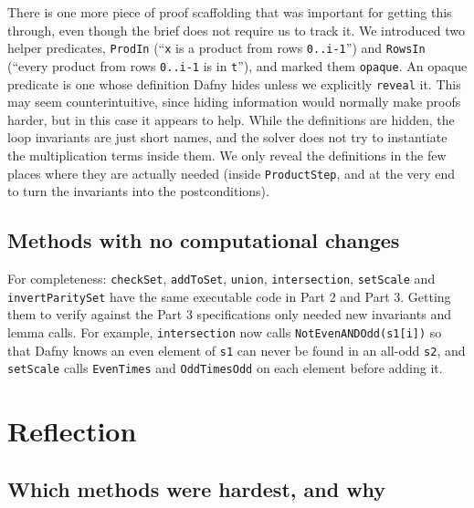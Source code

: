 \documentclass[11pt,a4paper]{article}
\begin{document}
There is one more piece of proof scaffolding that was important for getting this through, even though the brief does not require us to track it. We introduced two helper predicates, \texttt{ProdIn} (``\texttt{x} is a product from rows \texttt{0..i-1}'') and \texttt{RowsIn} (``every product from rows \texttt{0..i-1} is in \texttt{t}''), and marked them \texttt{opaque}. An opaque predicate is one whose definition Dafny hides unless we explicitly \texttt{reveal} it. This may seem counterintuitive, since hiding information would normally make proofs harder, but in this case it appears to help. While the definitions are hidden, the loop invariants are just short names, and the solver does not try to instantiate the multiplication terms inside them. We only reveal the definitions in the few places where they are actually needed (inside \texttt{ProductStep}, and at the very end to turn the invariants into the postconditions).

\subsection*{Methods with no computational changes}

For completeness: \texttt{checkSet}, \texttt{addToSet}, \texttt{union}, \texttt{intersection}, \texttt{setScale} and \texttt{invertParitySet} have the same executable code in Part 2 and Part 3. Getting them to verify against the Part 3 specifications only needed new invariants and lemma calls. For example, \texttt{intersection} now calls \texttt{NotEvenANDOdd(s1[i])} so that Dafny knows an even element of \texttt{s1} can never be found in an all-odd \texttt{s2}, and \texttt{setScale} calls \texttt{EvenTimes} and \texttt{OddTimesOdd} on each element before adding it.

\section{Reflection}

\subsection{Which methods were hardest, and why}
\end{document}
